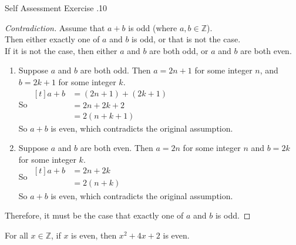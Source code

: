 \documentclass[\main/notes.tex]{subfiles}
\begin{document}
\begin{exercise}{Self Assessment Exercise \thechapter.10}
\begin{questions}
\begin{questions}
\begin{answer}
										\pagebreak
										\begin{proof}[Contradiction]
											Assume that $a + b$ is odd (where $a, b \in \mathbb{Z}$).\\
											Then either exactly one of $a$ and $b$ is odd, or that is not the case.\\
											If it is not the case, then either $a$ and $b$ are both odd, or $a$ and $b$ are both even.
											\begin{enumerate}[label=(\roman*)]
												\item Suppose $a$ and $b$ are both odd. Then $a = 2n + 1$ for some integer $n$, and $b = 2k + 1$ for some integer $k$.\\
													So $ \begin{aligned}[t]
														a + b &= (2n + 1) + (2k + 1)\\
														&= 2n + 2k + 2\\
														&= 2(n + k + 1)
													\end{aligned}$\\
													So $a + b$ is even, which contradicts the original assumption.
												\item Suppose $a$ and $b$ are both even. Then $a = 2n$ for some integer $n$ and $b = 2k$ for some integer $k$.\\
													So $ \begin{aligned}[t]
														a + b &= 2n + 2k\\
														&= 2(n + k)
													\end{aligned}$\\
													So $a + b$ is even, which contradicts the original assumption.
											\end{enumerate}
											Therefore, it must be the case that exactly one of $a$ and $b$ is odd.
										\end{proof}
									\end{answer}
								\item For all $x \in \mathbb{Z}$, if $x$ is even, then $x^{2} + 4x + 2$ is even.
\end{questions}
\end{questions}
\end{exercise}
\end{document}
